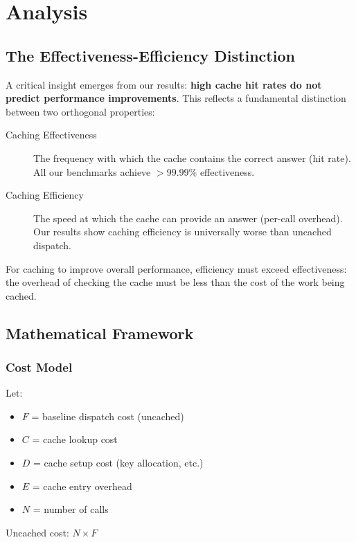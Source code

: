 \documentclass[sigplan,final,acmsmall,review,screen]{acmart}
\begin{document}
\section{Analysis}

\subsection{The Effectiveness-Efficiency Distinction}

A critical insight emerges from our results: \textbf{high cache hit rates do not predict
performance improvements}. This reflects a fundamental distinction between two orthogonal
properties:

\begin{description}
  \item[Caching Effectiveness] The frequency with which the cache contains the correct answer
    (hit rate). All our benchmarks achieve $>99.99\%$ effectiveness.

  \item[Caching Efficiency] The speed at which the cache can provide an answer (per-call overhead).
    Our results show caching efficiency is universally worse than uncached dispatch.
\end{description}

For caching to improve overall performance, efficiency must exceed effectiveness: the overhead
of checking the cache must be less than the cost of the work being cached.

\subsection{Mathematical Framework}

\subsubsection{Cost Model}

Let:
\begin{itemize}
  \item $F$ = baseline dispatch cost (uncached)
  \item $C$ = cache lookup cost
  \item $D$ = cache setup cost (key allocation, etc.)
  \item $E$ = cache entry overhead
  \item $N$ = number of calls
\end{itemize}

Uncached cost: $N \times F$
\end{document}
